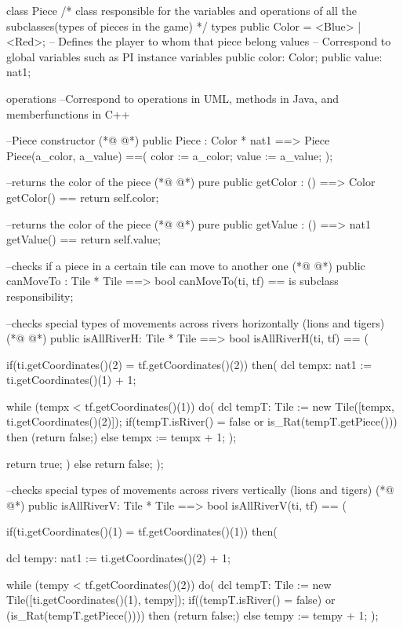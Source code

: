 \begin{vdmpp}[breaklines=true]
class Piece
/*
class responsible for the variables and operations of all the subclasses(types of pieces in the game)
*/
types
 public Color = <Blue> | <Red>; -- Defines the player to whom that piece belong
values
-- Correspond to global variables such as PI
instance variables
 public color: Color;
 public value: nat1;
 
operations --Correspond to operations in UML, methods in Java, and memberfunctions in C++ 

 --Piece constructor
(*@
\label{Piece:16}
@*)
 public Piece : Color * nat1 ==> Piece
 Piece(a_color, a_value) ==(
  color := a_color;
  value := a_value;
 );
 
 --returns the color of the piece
(*@
\label{getColor:23}
@*)
 pure public getColor : () ==> Color
 getColor() ==
  return self.color;
 
 --returns the color of the piece
(*@
\label{getValue:28}
@*)
 pure public getValue : () ==> nat1
 getValue() ==
  return self.value;
  
 --checks if a piece in a certain tile can move to another one
(*@
\label{canMoveTo:33}
@*)
 public canMoveTo : Tile * Tile  ==> bool
 canMoveTo(ti, tf) 
  == is subclass responsibility;
  
 --checks special types of movements across rivers horizontally (lions and tigers)
(*@
\label{isAllRiverH:38}
@*)
 public isAllRiverH: Tile * Tile ==> bool
 isAllRiverH(ti, tf) == (

  if(ti.getCoordinates()(2) = tf.getCoordinates()(2))   
    then(
    dcl tempx: nat1 := ti.getCoordinates()(1) + 1;  
    
    while (tempx < tf.getCoordinates()(1)) do(
     dcl tempT: Tile := new Tile([tempx, ti.getCoordinates()(2)]);
     if(tempT.isRiver() = false or is_Rat(tempT.getPiece()))
      then (return false;)
     else
      tempx := tempx + 1;
     );

     return true;
    )
  else return false;
 );
 
 --checks special types of movements across rivers vertically (lions and tigers)
(*@
\label{isAllRiverV:59}
@*)
 public isAllRiverV: Tile * Tile ==> bool
 isAllRiverV(ti, tf) == (
 
   if(ti.getCoordinates()(1) = tf.getCoordinates()(1))
    then(
   
    dcl tempy: nat1 := ti.getCoordinates()(2) + 1;  
    
    while (tempy < tf.getCoordinates()(2)) do(
     dcl tempT: Tile := new Tile([ti.getCoordinates()(1), tempy]);
     if((tempT.isRiver() = false) or (is_Rat(tempT.getPiece())))
      then (return false;)
     else
      tempy := tempy + 1;
     );


\end{vdmpp}
